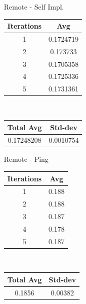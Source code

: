 \begin{enumerate}
\begin{center}
\begin{tabular}{||c c||}
             \hline
             \hline
            \end{tabular}
        \end{center}
    \item [Remote - Self Impl.]
        \begin{center}
            \begin{tabular}{||c c||} 
                 \hline
                 Iterations & Avg \\ [0.5ex] 
                 \hline\hline
                 1 & 0.1724719  \\ 
                 \hline
                 2 & 0.173733 \\ 
                 \hline
                 3 & 0.1705358  \\ 
                 \hline
                 4 & 0.1725336 \\ 
                 \hline
                 5 & 0.1731361   \\ 
                 \hline
                 \hline
                \end{tabular} \\
                \begin{tabular}{||c c||} 
                 \hline
                 Total Avg & Std-dev \\ [0.5ex] 
                 \hline\hline
                 0.17248208 & 0.0010754 \\ 
                 \hline
                \hline
            \end{tabular}
        \end{center}
    \item [Remote - Ping]
        \begin{center}
            \begin{tabular}{||c c||} 
                 \hline
                 Iterations & Avg \\ [0.5ex] 
                 \hline\hline
                 1 & 0.188  \\ 
                 \hline
                 2 & 0.188  \\ 
                 \hline
                 3 & 0.187  \\ 
                 \hline
                 4 & 0.178 \\ 
                 \hline
                 5 & 0.187   \\ 
                 \hline
                 \hline
                \end{tabular} \\
                \begin{tabular}{||c c||} 
                 \hline
                 Total Avg & Std-dev \\ [0.5ex] 
                 \hline\hline
                 0.1856 & 0.00382 \\ 
                 \hline
                \hline
            \end{tabular}
        \end{center}
\end{enumerate}

